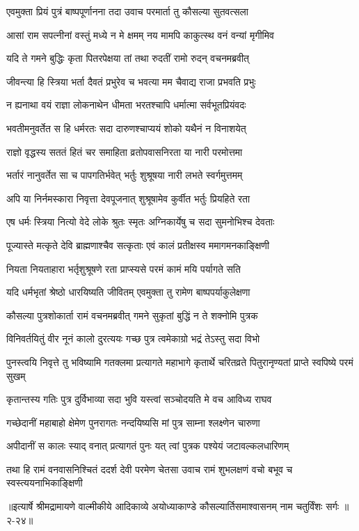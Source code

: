 \twolineshloka
{एवमुक्ता प्रियं पुत्रं बाष्पपूर्णानना तदा}
{उवाच परमार्ता तु कौसल्या सुतवत्सला} %

\twolineshloka
{आसां राम सपत्नीनां वस्तुं मध्ये न मे क्षमम्}
{नय मामपि काकुत्स्थ वनं वन्यां मृगीमिव} %

\twolineshloka
{यदि ते गमने बुद्धिः कृता पितरपेक्षया}
{तां तथा रुदतीं रामो रुदन् वचनमब्रवीत्} %

\twolineshloka
{जीवन्त्या हि स्त्रिया भर्ता दैवतं प्रभुरेव च}
{भवत्या मम चैवाद्य राजा प्रभवति प्रभुः} %

\twolineshloka
{न ह्यनाथा वयं राज्ञा लोकनाथेन धीमता}
{भरतश्चापि धर्मात्मा सर्वभूतप्रियंवदः} %

\twolineshloka
{भवतीमनुवर्तेत स हि धर्मरतः सदा}
{दारुणश्चाप्ययं शोको यथैनं न विनाशयेत्} %

\twolineshloka
{राज्ञो वृद्धस्य सततं हितं चर समाहिता}
{व्रतोपवासनिरता या नारी परमोत्तमा} %

\twolineshloka
{भर्तारं नानुवर्तेत सा च पापगतिर्भवेत्}
{भर्तुः शुश्रूषया नारी लभते स्वर्गमुत्तमम्} %

\twolineshloka
{अपि या निर्नमस्कारा निवृत्ता देवपूजनात्}
{शुश्रूषामेव कुर्वीत भर्तुः प्रियहिते रता} %

\twolineshloka
{एष धर्मः स्त्रिया नित्यो वेदे लोके श्रुतः स्मृतः}
{अग्निकार्येषु च सदा सुमनोभिश्च देवताः} %

\twolineshloka
{पूज्यास्ते मत्कृते देवि ब्राह्मणाश्चैव सत्कृताः}
{एवं कालं प्रतीक्षस्व ममागमनकाङ्क्षिणी} %

\twolineshloka
{नियता नियताहारा भर्तृशुश्रूषणे रता}
{प्राप्स्यसे परमं कामं मयि पर्यागते सति} %

\twolineshloka
{यदि धर्मभृतां श्रेष्ठो धारयिष्यति जीवितम्}
{एवमुक्ता तु रामेण बाष्पपर्याकुलेक्षणा} %

\twolineshloka
{कौसल्या पुत्रशोकार्ता रामं वचनमब्रवीत्}
{गमने सुकृतां बुद्धिं न ते शक्नोमि पुत्रक} %

\twolineshloka
{विनिवर्तयितुं वीर नूनं कालो दुरत्ययः}
{गच्छ पुत्र त्वमेकाग्रो भद्रं तेऽस्तु सदा विभो} %

\threelineshloka
{पुनस्त्वयि निवृत्ते तु भविष्यामि गतक्लमा}
{प्रत्यागते महाभागे कृतार्थे चरितव्रते}
{पितुरानृण्यतां प्राप्ते स्वपिष्ये परमं सुखम्} %

\twolineshloka
{कृतान्तस्य गतिः पुत्र दुर्विभाव्या सदा भुवि}
{यस्त्वां सञ्चोदयति मे वच आविध्य राघव} %

\twolineshloka
{गच्छेदानीं महाबाहो क्षेमेण पुनरागतः}
{नन्दयिष्यसि मां पुत्र साम्ना श्लक्ष्णेन चारुणा} %

\twolineshloka
{अपीदानीं स कालः स्याद् वनात् प्रत्यागतं पुनः}
{यत् त्वां पुत्रक पश्येयं जटावल्कलधारिणम्} %

\twolineshloka
{तथा हि रामं वनवासनिश्चितं ददर्श देवी परमेण चेतसा}
{उवाच रामं शुभलक्षणं वचो बभूव च स्वस्त्ययनाभिकाङ्क्षिणी} %


॥इत्यार्षे श्रीमद्रामायणे वाल्मीकीये आदिकाव्ये अयोध्याकाण्डे कौसल्यार्तिसमाश्वासनम् नाम चतुर्विंशः सर्गः ॥२-२४॥
